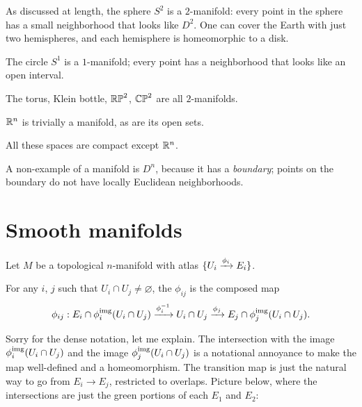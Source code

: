 \begin{example}
	\listhack
	\begin{enumerate}[(a)]
		\ii As discussed at length,
		the sphere $S^2$ is a $2$-manifold: every point in the sphere has a
		small neighborhood that looks like $D^2$.
			One can cover the Earth with just two hemispheres,
		and each hemisphere is homeomorphic to a disk.

		\ii The circle $S^1$ is a $1$-manifold; every point has a neighborhood that looks
		like an open interval.

		\ii The torus, Klein bottle, $\mathbb{RP}^2$, $\mathbb{CP}^2$ are all $2$-manifolds.

		\ii $\mathbb R^n$ is trivially a manifold, as are its open sets.
	\end{enumerate}
	All these spaces are compact except $\mathbb R^n$.

	A non-example of a manifold is $D^n$, because it has a \emph{boundary};
	points on the boundary do not have locally Euclidean neighborhoods.
\end{example}

\section{Smooth manifolds}

Let $M$ be a topological $n$-manifold with atlas
$\{U_i \xrightarrow{\phi_i} E_i\}$.
\begin{definition}
	For any $i$, $j$ such that $U_i \cap U_j \neq \varnothing$,
	the  $\phi_{ij}$ is the composed map
	\[
		\phi_{ij} : E_i \cap \phi_i^{\text{img}}(U_i \cap U_j)
		\xrightarrow{\phi_i^{-1}}
		U_i \cap U_j
		\xrightarrow{\phi_j} E_j \cap \phi_j^{\text{img}}(U_i \cap U_j).
	\]
\end{definition}
Sorry for the dense notation, let me explain.
The intersection with the image $\phi_i^{\text{img}}(U_i \cap U_j)$
and the image $\phi_j^{\text{img}}(U_i \cap U_j)$ is a notational annoyance
to make the map well-defined and a homeomorphism.
The transition map is just the natural way to go from $E_i \to E_j$,
restricted to overlaps.
Picture below, where the intersections are just the green portions
of each $E_1$ and $E_2$:

